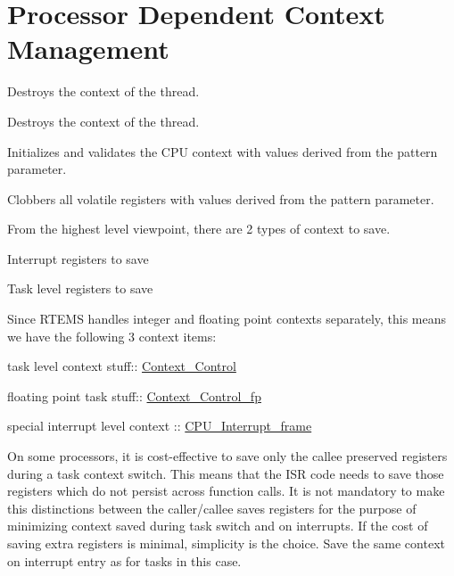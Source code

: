 \hypertarget{group__RTEMSScoreCPUExampleContext}{}\section{Processor Dependent Context Management}
\label{group__RTEMSScoreCPUExampleContext}


Destroys the context of the thread.  


Destroys the context of the thread. 

Initializes and validates the C\+PU context with values derived from the pattern parameter.

Clobbers all volatile registers with values derived from the pattern parameter.

From the highest level viewpoint, there are 2 types of context to save.


\begin{DoxyEnumerate}
\item Interrupt registers to save
\item Task level registers to save
\end{DoxyEnumerate}

Since R\+T\+E\+MS handles integer and floating point contexts separately, this means we have the following 3 context items\+:


\begin{DoxyEnumerate}
\item task level context stuff\+:\+: \mbox{\hyperlink{structContext__Control}{Context\+\_\+\+Control}}
\item floating point task stuff\+:\+: \mbox{\hyperlink{structContext__Control__fp}{Context\+\_\+\+Control\+\_\+fp}}
\item special interrupt level context \+:: \mbox{\hyperlink{structCPU__Interrupt__frame}{C\+P\+U\+\_\+\+Interrupt\+\_\+frame}}
\end{DoxyEnumerate}

On some processors, it is cost-\/effective to save only the callee preserved registers during a task context switch. This means that the I\+SR code needs to save those registers which do not persist across function calls. It is not mandatory to make this distinctions between the caller/callee saves registers for the purpose of minimizing context saved during task switch and on interrupts. If the cost of saving extra registers is minimal, simplicity is the choice. Save the same context on interrupt entry as for tasks in this case.

